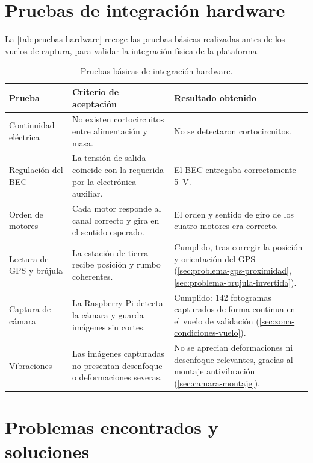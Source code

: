 \section{Pruebas de integración hardware}
\label{sec:pruebas-hardware}

La \autoref{tab:pruebas-hardware} recoge las pruebas básicas realizadas antes de los vuelos de captura, para validar la integración física de la plataforma.

\begin{table}[htbp]
\centering
\caption{Pruebas básicas de integración hardware.}
\label{tab:pruebas-hardware}
\begin{tabularx}{\textwidth}{p{}Xp{}}
\toprule
\textbf{Prueba} & \textbf{Criterio de aceptación} & \textbf{Resultado obtenido} \\
\midrule
Continuidad eléctrica & No existen cortocircuitos entre alimentación y masa. & No se detectaron cortocircuitos. \\
Regulación del BEC & La tensión de salida coincide con la requerida por la electrónica auxiliar. & El BEC entregaba correctamente \SI{5}{\volt}. \\
Orden de motores & Cada motor responde al canal correcto y gira en el sentido esperado. & El orden y sentido de giro de los cuatro motores era correcto. \\
Lectura de GPS y brújula & La estación de tierra recibe posición y rumbo coherentes. & Cumplido, tras corregir la posición y orientación del GPS (\autoref{sec:problema-gps-proximidad}, \autoref{sec:problema-brujula-invertida}). \\
Captura de cámara & La Raspberry Pi detecta la cámara y guarda imágenes sin cortes. & Cumplido: 142 fotogramas capturados de forma continua en el vuelo de validación (\autoref{sec:zona-condiciones-vuelo}). \\
Vibraciones & Las imágenes capturadas no presentan desenfoque o deformaciones severas. & No se aprecian deformaciones ni desenfoque relevantes, gracias al montaje antivibración (\autoref{sec:camara-montaje}). \\
\bottomrule
\end{tabularx}
\end{table}

\section{Problemas encontrados y soluciones}
\label{sec:problemas-hardware}

